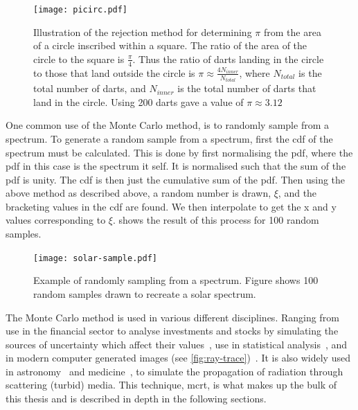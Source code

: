 \begin{figure}[!ht]
    \centering
    \texttt{[image: picirc.pdf]}
    \caption{Illustration of the rejection method for determining $\pi$ from the area of a circle inscribed within a square. The ratio of the area of the circle to the square is $\tfrac{\pi}{4}$. Thus the ratio of darts landing in the circle to those that land outside the circle is $\pi \approx \tfrac{4N_{inner}}{N_{total}}$, where $N_{total}$ is the total number of darts, and $N_{inner}$ is the total number of darts that land in the circle. Using 200 darts gave a value of $\pi \approx 3.12$}
    \label{fig:picircle}
\end{figure}


One common use of the Monte Carlo method, is to randomly sample from a spectrum.
To generate a random sample from a spectrum, first the \gls*{cdf} of the spectrum must be calculated.
This is done by first normalising the \gls*{pdf}, where the \gls*{pdf} in this case is the spectrum it self.
It is normalised such that the sum of the \gls*{pdf} is unity.
The \gls*{cdf} is then just the cumulative sum of the \gls*{pdf}.
Then using the above method as described above, a random number is drawn, $\xi$, and the bracketing values in the \gls*{cdf} are found.
We then interpolate to get the x and y values corresponding to $\xi$.
 shows the result of this process for 100 random samples.

\begin{figure}[!htbp]
    \centering
    \texttt{[image: solar-sample.pdf]}
    \caption{Example of randomly sampling from a spectrum. Figure shows 100 random samples drawn to recreate a solar spectrum.}
    \label{fig:solar}
\end{figure}

The Monte Carlo method is used in various different disciplines. Ranging from use in the financial sector to analyse investments and stocks by simulating the sources of uncertainty which affect their values~\cite{jackel2002monte,finaceprrof}, use in statistical analysis~\cite{wall2012practical}, and in modern computer generated images (see \cref{fig:ray-trace})~\cite{Kajiyarendering,Cookraytracing}. It is also widely used in astronomy~\cite{robitaille2011hyperion,harries2014torus} and medicine~\cite{valentine2011monte,campbell2015monte}, to simulate the propagation of radiation through scattering (turbid) media. This technique, \gls*{mcrt}, is what makes up the bulk of this thesis and is described in depth in the following sections.

